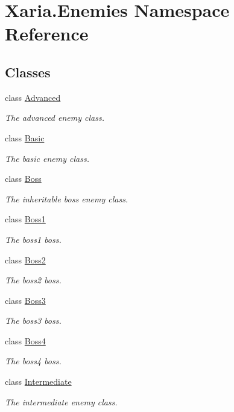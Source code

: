\hypertarget{namespaceXaria_1_1Enemies}{}\section{Xaria.\+Enemies Namespace Reference}
\label{namespaceXaria_1_1Enemies}
\subsection*{Classes}
\begin{DoxyCompactItemize}
\item 
class \hyperlink{classXaria_1_1Enemies_1_1Advanced}{Advanced}
\begin{DoxyCompactList}\small\item\em The advanced enemy class. \end{DoxyCompactList}\item 
class \hyperlink{classXaria_1_1Enemies_1_1Basic}{Basic}
\begin{DoxyCompactList}\small\item\em The basic enemy class. \end{DoxyCompactList}\item 
class \hyperlink{classXaria_1_1Enemies_1_1Boss}{Boss}
\begin{DoxyCompactList}\small\item\em The inheritable boss enemy class. \end{DoxyCompactList}\item 
class \hyperlink{classXaria_1_1Enemies_1_1Boss1}{Boss1}
\begin{DoxyCompactList}\small\item\em The boss1 boss. \end{DoxyCompactList}\item 
class \hyperlink{classXaria_1_1Enemies_1_1Boss2}{Boss2}
\begin{DoxyCompactList}\small\item\em The boss2 boss. \end{DoxyCompactList}\item 
class \hyperlink{classXaria_1_1Enemies_1_1Boss3}{Boss3}
\begin{DoxyCompactList}\small\item\em The boss3 boss. \end{DoxyCompactList}\item 
class \hyperlink{classXaria_1_1Enemies_1_1Boss4}{Boss4}
\begin{DoxyCompactList}\small\item\em The boss4 boss. \end{DoxyCompactList}\item 
class \hyperlink{classXaria_1_1Enemies_1_1Intermediate}{Intermediate}
\begin{DoxyCompactList}\small\item\em The intermediate enemy class. \end{DoxyCompactList}\end{DoxyCompactItemize}
